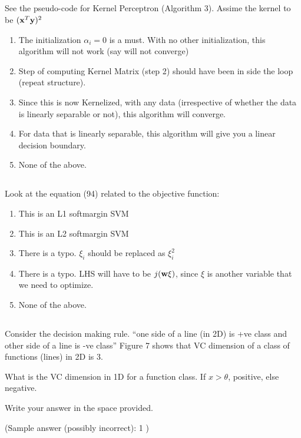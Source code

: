 \begin{frame}
\section{}
See the pseudo-code for Kernel Perceptron (Algorithm 3). Assime the kernel to be
$({\bf x}^T{\bf y})^2$
\begin{enumerate}[label=(\Alph*)]
\item The initialization $\alpha_i=0$ is a must. With no other initialization, this algorithm will not work (say will not converge)
\item Step of computing Kernel Matrix (step 2) should have been in side the loop (repeat structure).
\item Since this is now Kernelized, with any data (irrespective of whether the data is linearly separable or not), this algorithm will converge.
\item For data that is linearly separable, this algorithm will give you a linear decision boundary.
\item None of the above.  %
\end{enumerate}
\end{frame}


\begin{frame}
\section{}
Look at the equation (94) related to the objective function:
\begin{enumerate}[label=(\Alph*)]
\item This is an L1 softmargin SVM  %
\item This is an L2 softmargin SVM
\item There is a typo. $\xi_i$ should be replaced as $\xi_i^2$
\item There is a typo. LHS will have to be
$j({\bf w}{\bf \xi})$, since $\xi$ is another variable that we need to optimize.
\item None of the above.    %
\end{enumerate}
\end{frame}

\begin{frame}
\section{}
Consider the decision making rule. ``one side of a line (in 2D) is +ve class and other side of a line is -ve class''  Figure 7 shows that VC dimension of a class of functions (lines) in 2D is 3.

What is the VC dimension in 1D for a function class. If $x>\theta$, positive, else negative.

Write your answer in the space provided.

(Sample answer (possibly incorrect): 1 )
\end{frame}
